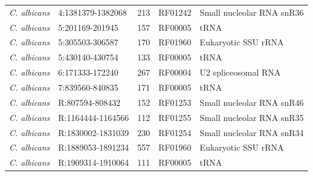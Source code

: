 \documentclass[12pt]{report}
\begin{document}
\begin{table}[H]
\begin{tabular}{|l|l|c|c|l|}
    \textit{C. albicans} & 4:1381379-1382068 & 213 & RF01242 & Small nucleolar RNA snR36\\
    \textit{C. albicans} & 5:201169-201945 & 157 & RF00005 & tRNA\\
    \textit{C. albicans} & 5:305503-306587 & 170 & RF01960 & Eukaryotic SSU rRNA\\
    \textit{C. albicans} & 5:430140-430754 & 133 & RF00005 & tRNA\\
    \textit{C. albicans} & 6:171333-172240 & 267 & RF00004 & U2 spliceosomal RNA\\
    \textit{C. albicans} & 7:839560-840835 & 171 & RF00005 & tRNA\\
    \textit{C. albicans} & R:807594-808432 & 152 & RF01253 & Small nucleolar RNA snR46\\
    \textit{C. albicans} & R:1164444-1164566 & 112 & RF01255 & Small nucleolar RNA snR35\\
    \textit{C. albicans} & R:1830002-1831039 & 230 & RF01254 & Small nucleolar RNA snR34\\
    \textit{C. albicans} & R:1889053-1891234 & 557 & RF01960 & Eukaryotic SSU rRNA\\
    \textit{C. albicans} & R:1909314-1910064 & 111 & RF00005 & tRNA\\
    \hline
  \end{tabular}
\end{table}
\end{document}
